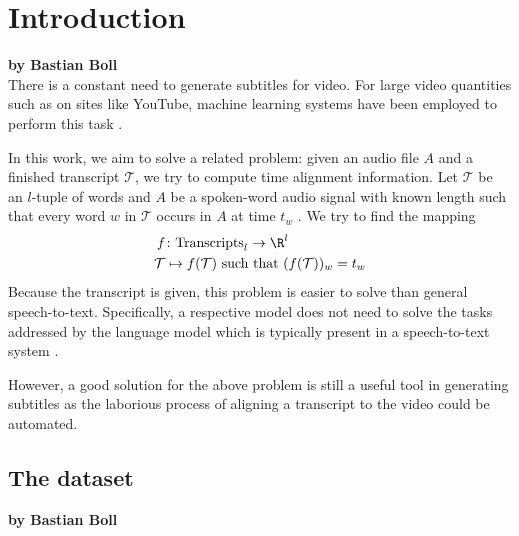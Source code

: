 \chapter{Introduction}
\label{chap:intro}

\textbf{by Bastian Boll} \\

There is a constant need to generate subtitles for video. For large video quantities such as on sites like YouTube, machine learning systems have been employed to perform this task \cite{youtubeFAQ}. 

In this work, we aim to solve a related problem: given an audio file $A$ and a finished transcript $\mathcal{T}$, we try to compute time alignment information. Let $\mathcal{T}$ be an $l$-tuple of words and $A$ be a spoken-word audio signal with known length such that every word $w$ in $\mathcal{T}$ occurs in $A$ at time $t_w$ . We try to find the mapping
\begin{align*}
	f&\colon\textrm{Transcripts}_l\to\R^l\\
	\mathcal{T}&\mapsto f(\mathcal{T})\textrm{ such that }(f(\mathcal{T}))_w=t_w
\end{align*}
Because the transcript is given, this problem is easier to solve than general speech-to-text. Specifically, a respective model does not need to solve the tasks addressed by the language model which is typically present in a speech-to-text system \cite{anusuya2010speech}.

However, a good solution for the above problem is still a useful tool in generating subtitles as the laborious process of aligning a transcript to the video could be automated.

\section{The dataset}

\textbf{by Bastian Boll} \\

